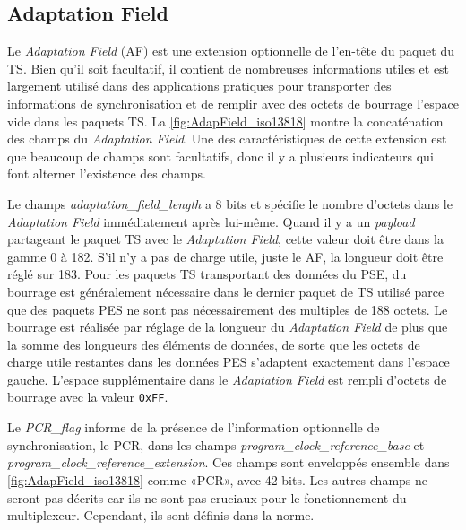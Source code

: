 \documentclass[12pt,a4paper]{article}
\begin{document}
\subsection{Adaptation Field}

Le \textit{Adaptation Field} (AF) est une extension optionnelle de l'en-tête du paquet du TS. Bien qu'il soit facultatif, il contient de nombreuses informations utiles et est largement utilisé dans des applications pratiques pour transporter des informations de synchronisation et de remplir avec des octets de bourrage l'espace vide dans les paquets TS. La \autoref{fig:AdapField_iso13818} montre la concaténation des champs du \textit{Adaptation Field}. Une des caractéristiques de cette extension est que beaucoup de champs sont facultatifs, donc il y a plusieurs indicateurs qui font alterner l'existence des champs.

Le champs \textit{adaptation\hspace{0.1mm}\_\hspace{0.1mm}field\hspace{0.1mm}\_\hspace{0.1mm}length} a 8 bits et spécifie le nombre d'octets dans le \textit{Adaptation Field} immédiatement après lui-même. Quand il y a un \textit{payload} partageant le paquet TS avec le \textit{Adaptation Field}, cette valeur doit être dans la gamme 0 à 182. S'il n'y a pas de charge utile, juste le AF, la longueur doit être réglé sur 183. Pour les paquets TS transportant des données du PSE, du bourrage est généralement nécessaire dans le dernier paquet de TS utilisé parce que des paquets PES ne sont pas nécessairement des multiples de 188 octets. Le bourrage est réalisée par réglage de la longueur du \textit{Adaptation Field} de plus que la somme des longueurs des éléments de données, de sorte que les octets de charge utile restantes dans les données PES s'adaptent exactement dans l'espace gauche. L'espace supplémentaire dans le \textit{Adaptation Field} est rempli d'octets de bourrage avec la valeur \texttt{0xFF}.

Le \textit{PCR\hspace{0.1mm}\_\hspace{0.1mm}flag} informe de la présence de l'information optionnelle de synchronisation, le PCR, dans les champs \textit{program\hspace{0.1mm}\_\hspace{0.1mm}clock\hspace{0.1mm}\_\hspace{0.1mm}reference\hspace{0.1mm}\_\hspace{0.1mm}base} et \textit{program\hspace{0.1mm}\_\hspace{0.1mm}clock\hspace{0.1mm}\_\hspace{0.1mm}reference\hspace{0.1mm}\_\hspace{0.1mm}extension}. Ces champs sont enveloppés ensemble dans \autoref{fig:AdapField_iso13818} comme «PCR», avec 42 bits. Les autres champs ne seront pas décrits car ils ne sont pas cruciaux pour le fonctionnement du multiplexeur. Cependant, ils sont définis dans la norme\cite[2.4.3.5]{ISO}.
\end{document}
